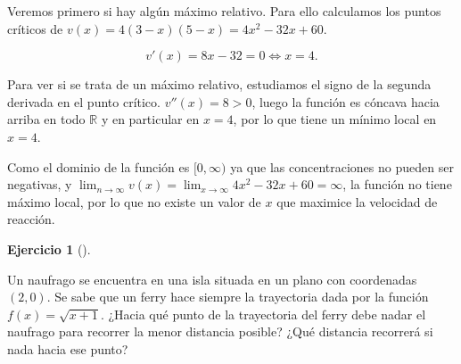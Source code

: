 \documentclass[
  spanish,
  a4paper,
]{scrreport}
\theoremstyle{definition}
\newtheorem{exercise}{Ejercicio}[chapter]
\theoremstyle{remark}
\begin{document}
\begin{tcolorbox}[enhanced jigsaw, arc=.35mm, bottomrule=.15mm, bottomtitle=1mm, breakable, colback=white, colbacktitle=quarto-callout-tip-color!10!white, colframe=quarto-callout-tip-color-frame, coltitle=black, left=2mm, leftrule=.75mm, opacityback=0, opacitybacktitle=0.6, rightrule=.15mm, title=\textcolor{quarto-callout-tip-color}{\faLightbulb}\hspace{0.5em}{Solución}, titlerule=0mm, toprule=.15mm, toptitle=1mm]

Veremos primero si hay algún máximo relativo. Para ello calculamos los
puntos críticos de \(v(x)=4(3-x)(5-x)=4x^2-32x+60\).

\[
v'(x) = 8x-32 = 0 \Leftrightarrow x = 4.
\]

Para ver si se trata de un máximo relativo, estudiamos el signo de la
segunda derivada en el punto crítico. \(v''(x)= 8>0\), luego la función
es cóncava hacia arriba en todo \(\mathbb{R}\) y en particular en
\(x=4\), por lo que tiene un mínimo local en \(x=4\).

Como el dominio de la función es \([0,\infty)\) ya que las
concentraciones no pueden ser negativas, y
\(\lim_{n\to\infty}v(x) = \lim_{x\to\infty}4x^2-32x+60=\infty\), la
función no tiene máximo local, por lo que no existe un valor de \(x\)
que maximice la velocidad de reacción.

\end{tcolorbox}

\begin{exercise}[]\protect\hypertarget{exr-extremos-5}{}\label{exr-extremos-5}

Un naufrago se encuentra en una isla situada en un plano con coordenadas
\((2,0)\). Se sabe que un ferry hace siempre la trayectoria dada por la
función \(f(x)=\sqrt{x+1}\). ¿Hacia qué punto de la trayectoria del
ferry debe nadar el naufrago para recorrer la menor distancia posible?
¿Qué distancia recorrerá si nada hacia ese punto?

\end{exercise}
\end{document}
